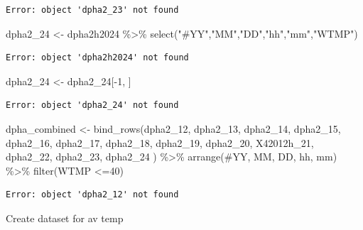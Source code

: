 \documentclass[
  letterpaper,
  DIV=11,
  numbers=noendperiod]{scrreprt}
\newenvironment{Shaded}{\begin{snugshade}}{\end{snugshade}}
\newcommand{\AttributeTok}[1]{\textcolor[rgb]{0.40,0.45,0.13}{#1}}
\newcommand{\DecValTok}[1]{\textcolor[rgb]{0.68,0.00,0.00}{#1}}
\newcommand{\FunctionTok}[1]{\textcolor[rgb]{0.28,0.35,0.67}{#1}}
\newcommand{\NormalTok}[1]{\textcolor[rgb]{0.00,0.23,0.31}{#1}}
\newcommand{\OtherTok}[1]{\textcolor[rgb]{0.00,0.23,0.31}{#1}}
\newcommand{\SpecialCharTok}[1]{\textcolor[rgb]{0.37,0.37,0.37}{#1}}
\newcommand{\StringTok}[1]{\textcolor[rgb]{0.13,0.47,0.30}{#1}}
\begin{document}
\begin{verbatim}
Error: object 'dpha2_23' not found
\end{verbatim}

\begin{Shaded}
\begin{Highlighting}[]
\NormalTok{dpha2\_24 }\OtherTok{\textless{}{-}}\NormalTok{ dpha2h2024 }\SpecialCharTok{\%\textgreater{}\%} \FunctionTok{select}\NormalTok{(}\StringTok{"\#YY"}\NormalTok{,}\StringTok{"MM"}\NormalTok{,}\StringTok{"DD"}\NormalTok{,}\StringTok{"hh"}\NormalTok{,}\StringTok{"mm"}\NormalTok{,}\StringTok{"WTMP"}\NormalTok{) }
\end{Highlighting}
\end{Shaded}

\begin{verbatim}
Error: object 'dpha2h2024' not found
\end{verbatim}

\begin{Shaded}
\begin{Highlighting}[]
\NormalTok{dpha2\_24 }\OtherTok{\textless{}{-}}\NormalTok{ dpha2\_24[}\SpecialCharTok{{-}}\DecValTok{1}\NormalTok{, ]}
\end{Highlighting}
\end{Shaded}

\begin{verbatim}
Error: object 'dpha2_24' not found
\end{verbatim}

\begin{Shaded}
\begin{Highlighting}[]
\NormalTok{dpha\_combined }\OtherTok{\textless{}{-}} \FunctionTok{bind\_rows}\NormalTok{(dpha2\_12, dpha2\_13, dpha2\_14, dpha2\_15, dpha2\_16, dpha2\_17, dpha2\_18, dpha2\_19, dpha2\_20, X42012h\_21, dpha2\_22, dpha2\_23, dpha2\_24}
\NormalTok{) }\SpecialCharTok{\%\textgreater{}\%}
  \FunctionTok{arrange}\NormalTok{(}\StringTok{\textasciigrave{}}\AttributeTok{\#YY}\StringTok{\textasciigrave{}}\NormalTok{, MM, DD, hh, mm) }\SpecialCharTok{\%\textgreater{}\%}
  \FunctionTok{filter}\NormalTok{(WTMP }\SpecialCharTok{\textless{}=}\DecValTok{40}\NormalTok{)}
\end{Highlighting}
\end{Shaded}

\begin{verbatim}
Error: object 'dpha2_12' not found
\end{verbatim}

Create dataset for av temp
\end{document}
